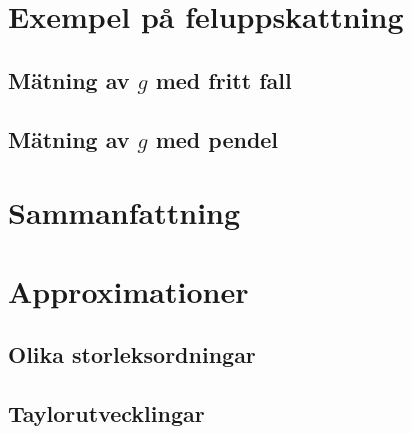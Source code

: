 \documentclass[11pt,a4paper, english, swedish
]{article}
\begin{document}
\section{Exempel på feluppskattning}

\subsection{Mätning av $g$ med fritt fall}

\subsection{Mätning av $g$ med pendel}


\section{Sammanfattning}

%

\clearpage
\appendix


\section{Approximationer}

\subsection{Olika storleksordningar}

\subsection{Taylorutvecklingar}

\begin{figure}
\centering

\caption{}
\label{fig_taylor_sin}
\end{figure}
\end{document}
